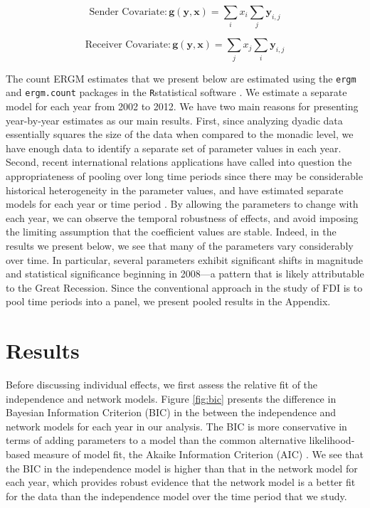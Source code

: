 \documentclass[reqno,onecolumn,letterpaper,12pt]{article}
\newcommand{\R}{\texttt{R}} %
\begin{document}
$$ \text{Sender Covariate}: \bm{g(y,x)} = \sum_{i}x_i \sum_{j} \bm{y}_{i,j}$$

$$ \text{Receiver Covariate}: \bm{g(y,x)} = \sum_{j}x_j \sum_{i} \bm{y}_{i,j}$$

\noindent The count ERGM estimates that we present below are estimated using the \texttt{ergm} \citep{ergm} and \texttt{ergm.count} \citep{ergmcount} packages in the \R \space statistical software \citep{r}. We estimate a separate model for each year from 2002 to 2012. We have two main reasons for presenting year-by-year estimates as our main results. First, since analyzing dyadic data essentially squares the size of the data when compared to the monadic level, we have enough data to identify a separate set of parameter values in each year. Second, recent international relations applications have called into question the appropriateness of pooling over long time periods since there may be considerable historical heterogeneity in the parameter values, and have estimated separate models for each year or time period  \citep[see,~e.g.,][]{cranmer2014reciprocity,cranmer2012toward,cao2014democracies,ward2007persistent}. By allowing the parameters to change with each year, we can observe the temporal robustness of effects, and avoid imposing the limiting assumption that the coefficient values are stable. Indeed, in the results we present below, we see that many of the parameters vary considerably over time. In particular, several parameters exhibit significant shifts in magnitude and statistical significance beginning in 2008---a pattern that is likely attributable to the Great Recession. %
Since the conventional approach in the study of FDI is to pool time periods into a panel, we present pooled results in the Appendix.


\section{Results}

Before discussing individual effects, we first assess the relative fit of the independence and network models. Figure \ref{fig:bic} presents the difference in Bayesian Information Criterion (BIC) in the between the independence and network models for each year in our analysis. The BIC is more conservative in terms of adding parameters to a model than the common alternative likelihood-based measure of model fit, the Akaike Information Criterion (AIC) \citep{waldorp2005model,abrahamowicz1990optimal,raftery1999bayes}. We see that the BIC in the independence model is higher than that in the network model for each year, which provides robust evidence that the network model is a better fit for the data than the independence model over the time period that we study.
\end{document}
